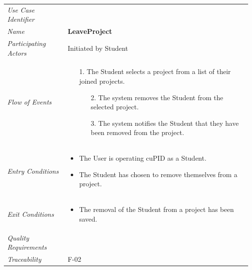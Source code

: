 \documentclass[12pt,letterpaper]{article}
\begin{document}
\begin{center}
	\begin{tabu} to 
		\toprule
		Use Case Identifier &  \\
		Name & {\bf LeaveProject} \\
		Participating Actors & Initiated by Student \\
		Flow of Events & 
		\begin{minipage}[t]{\linewidth}
		    \begin{enumerate}
			    \item[1.] The Student selects a project from a list of their joined projects.
			    \begin{enumerate}
			    		\item[2.] The system removes the Student from the selected project.
					\item[3.] The system notifies the Student that they have been removed from the project.
			    \end{enumerate}
			\end{enumerate}
		\end{minipage} \\

		Entry Conditions &
		\begin{minipage}[t]{\linewidth}
			\begin{itemize}
			    \item The User is operating cuPID as a Student.
			    \item The Student has chosen to remove themselves from a project.
	        \end{itemize}
		\end{minipage} \\

		Exit Conditions &
		\begin{minipage}[t]{\linewidth}
			\begin{itemize}
			    \item The removal of the Student from a project has been saved.
	        \end{itemize}
		\end{minipage} \\

		Quality Requirements & \\

		Traceability & F-02 \\
		\toprule
	\end{tabu}
\end{center}
\end{document}
